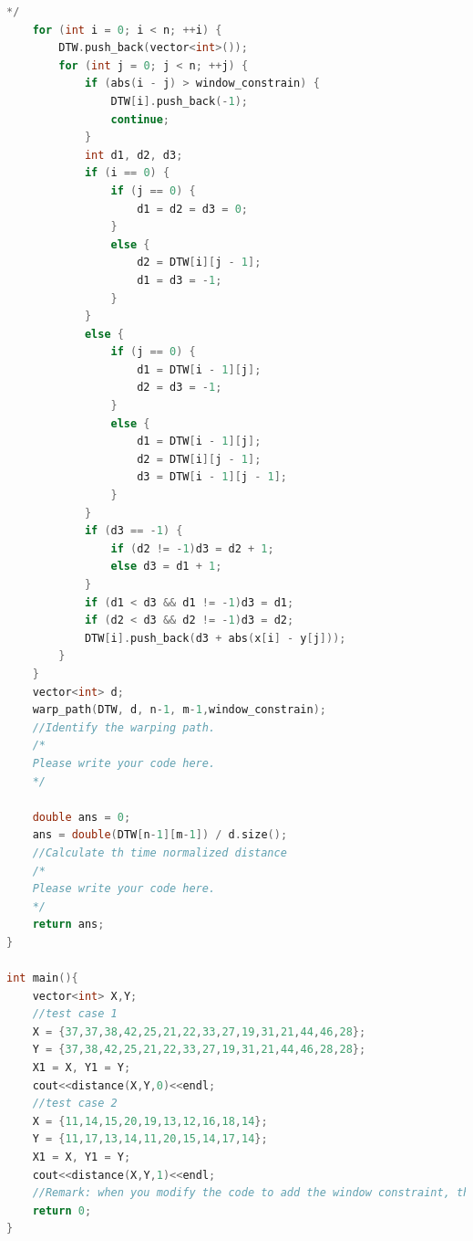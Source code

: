 \documentclass[12pt,a4paper]{article}
\theoremstyle{definition}
\begin{document}
\begin{lstlisting}[language=C++]
    */
    for (int i = 0; i < n; ++i) {
        DTW.push_back(vector<int>());
        for (int j = 0; j < n; ++j) {
            if (abs(i - j) > window_constrain) {
                DTW[i].push_back(-1);
                continue;
            }
            int d1, d2, d3;
            if (i == 0) {
                if (j == 0) {
                    d1 = d2 = d3 = 0;
                }
                else {
                    d2 = DTW[i][j - 1];
                    d1 = d3 = -1;
                }
            }
            else {
                if (j == 0) {
                    d1 = DTW[i - 1][j];
                    d2 = d3 = -1;
                }
                else {
                    d1 = DTW[i - 1][j];
                    d2 = DTW[i][j - 1];
                    d3 = DTW[i - 1][j - 1];
                }
            }
            if (d3 == -1) {
                if (d2 != -1)d3 = d2 + 1;
                else d3 = d1 + 1;
            }
            if (d1 < d3 && d1 != -1)d3 = d1;
            if (d2 < d3 && d2 != -1)d3 = d2;
            DTW[i].push_back(d3 + abs(x[i] - y[j]));
        }
    }
    vector<int> d;
    warp_path(DTW, d, n-1, m-1,window_constrain);
    //Identify the warping path.
    /*
    Please write your code here.
    */

    double ans = 0;
    ans = double(DTW[n-1][m-1]) / d.size();
    //Calculate th time normalized distance
    /*
    Please write your code here.
    */
    return ans;
}

int main(){
	vector<int> X,Y;
	//test case 1
	X = {37,37,38,42,25,21,22,33,27,19,31,21,44,46,28};
	Y = {37,38,42,25,21,22,33,27,19,31,21,44,46,28,28};
    X1 = X, Y1 = Y;
	cout<<distance(X,Y,0)<<endl;
	//test case 2
	X = {11,14,15,20,19,13,12,16,18,14};
	Y = {11,17,13,14,11,20,15,14,17,14};
    X1 = X, Y1 = Y;
	cout<<distance(X,Y,1)<<endl;
	//Remark: when you modify the code to add the window constraint, the distance function has thus three inputs: X, Y, and the size of window w.
	return 0;
}



\end{lstlisting}	
\end{document}

